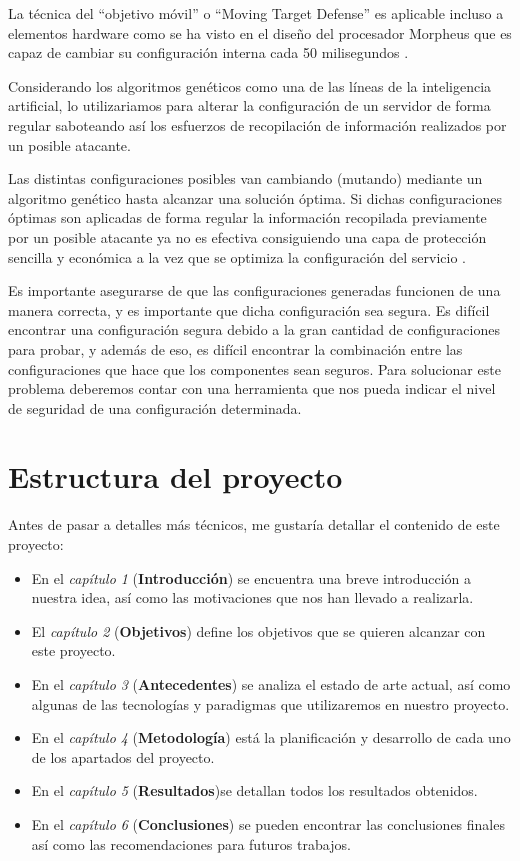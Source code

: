 \bigskip
La técnica del ``objetivo móvil'' o ``Moving Target Defense'' es aplicable incluso a elementos hardware como se ha visto en el diseño del procesador Morpheus que es capaz de cambiar su configuración interna cada 50 milisegundos \cite{gallagher_morpheus:_2019}.

\bigskip
Considerando los algoritmos genéticos como una de las líneas de la inteligencia artificial, lo utilizariamos \cite{tribak_alisis_2012} para alterar la configuración de un servidor de forma regular saboteando así los esfuerzos de recopilación de información realizados por un posible atacante.

\bigskip
Las distintas configuraciones posibles van cambiando (mutando) mediante un algoritmo genético hasta alcanzar una solución óptima. Si dichas configuraciones óptimas son aplicadas de forma regular la información recopilada previamente por un posible atacante ya no es efectiva consiguiendo una capa de protección sencilla y económica a la vez que se optimiza la configuración del servicio \cite{gensch_evolving_2016}.

\bigskip
Es importante asegurarse de que las configuraciones generadas funcionen de una manera correcta, y es importante que dicha configuración sea segura. Es difícil encontrar una configuración segura debido a la gran cantidad de configuraciones para probar, y además de eso, es difícil encontrar la combinación entre las configuraciones que hace que los componentes sean seguros. Para solucionar este problema deberemos contar con una herramienta que nos pueda indicar el nivel de seguridad de una configuración determinada.


\section{Estructura del proyecto}

\bigskip
Antes de pasar a detalles más técnicos, me gustaría detallar el contenido de este proyecto:

\begin{itemize}
  \item En el \textit{capítulo 1} (\textbf{Introducción}) se encuentra una breve introducción a nuestra idea, así como las motivaciones que nos han llevado a realizarla.
  \item El \textit{capítulo 2} (\textbf{Objetivos}) define los objetivos que se quieren alcanzar con este proyecto.
  \item En el \textit{capítulo 3} (\textbf{Antecedentes}) se analiza el estado de arte actual, así como algunas de las tecnologías y paradigmas que utilizaremos en nuestro proyecto.
  \item En el \textit{capítulo 4} (\textbf{Metodología}) está la planificación y desarrollo de cada uno de los apartados del proyecto.
  \item En el \textit{capítulo 5} (\textbf{Resultados})se detallan todos los resultados obtenidos.
  \item En el \textit{capítulo 6} (\textbf{Conclusiones}) se pueden encontrar las conclusiones finales  así como las recomendaciones para futuros trabajos.

\end{itemize}

